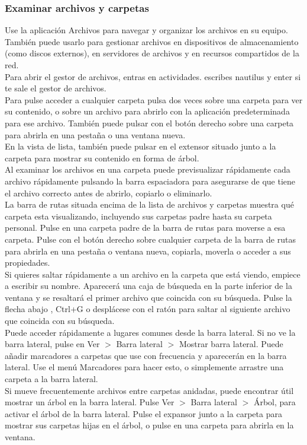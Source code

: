\subsubsection{Examinar archivos y carpetas}
Use la aplicación Archivos para navegar y organizar los archivos en su equipo. También puede usarlo para gestionar archivos en dispositivos de almacenamiento (como discos externos), en servidores de archivos y en recursos compartidos de la red.\\
Para abrir el gestor de archivos, entras en actividades. escribes nautilus y enter si te sale el gestor de archivos.\\
Para pulse acceder a cualquier carpeta pulsa dos veces sobre una carpeta para ver su contenido, o sobre un archivo para abrirlo con la aplicación predeterminada para ese archivo. También puede pulsar con el botón derecho sobre una carpeta para abrirla en una pestaña o una ventana nueva.\\ 
En la vista de lista, también puede pulsar en el extensor situado junto a la carpeta para mostrar su contenido en forma de árbol.\\
Al examinar los archivos en una carpeta puede previsualizar rápidamente cada archivo rápidamente pulsando la barra espaciadora para asegurarse de que tiene el archivo correcto antes de abrirlo, copiarlo o eliminarlo.\\
La barra de rutas situada encima de la lista de archivos y carpetas muestra qué carpeta esta visualizando, incluyendo sus carpetas padre hasta su carpeta personal. Pulse en una carpeta padre de la barra de rutas para moverse a esa carpeta. Pulse con el botón derecho sobre cualquier carpeta de la barra de rutas para abrirla en una pestaña o ventana nueva, copiarla, moverla o acceder a sus propiedades.\\
Si quieres saltar rápidamente a un archivo en la carpeta que está viendo, empiece a escribir su nombre. Aparecerá una caja de búsqueda en la parte inferior de la ventana y se resaltará el primer archivo que coincida con su búsqueda. Pulse la flecha abajo , Ctrl+G o desplácese con el ratón para saltar al siguiente archivo que coincida con su búsqueda.\\
Puede acceder rápidamente a lugares comunes desde la barra lateral. Si no ve la barra lateral, pulse en Ver $>$ Barra lateral $>$ Mostrar barra lateral. Puede añadir marcadores a carpetas que use con frecuencia y aparecerán en la barra lateral. Use el menú Marcadores para hacer esto, o simplemente arrastre una carpeta a la barra lateral.\\
Si mueve frecuentemente archivos entre carpetas anidadas, puede encontrar útil mostrar un árbol en la barra lateral. Pulse Ver $>$ Barra lateral $>$ Árbol, para activar el árbol de la barra lateral. Pulse el expansor junto a la carpeta para mostrar sus carpetas hijas en el árbol, o pulse en una carpeta para abrirla en la ventana.
